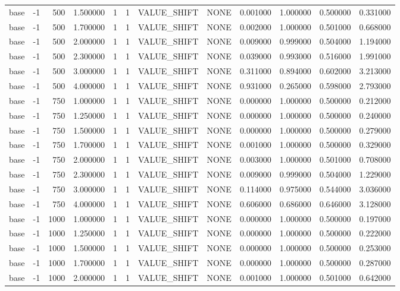 \begin{tabular}{lrrrllllrrrr}
base & -1 & 500 & 1.500000 & 1 & 1 & VALUE_SHIFT & NONE & 0.001000 & 1.000000 & 0.500000 & 0.331000 \\
base & -1 & 500 & 1.700000 & 1 & 1 & VALUE_SHIFT & NONE & 0.002000 & 1.000000 & 0.501000 & 0.668000 \\
base & -1 & 500 & 2.000000 & 1 & 1 & VALUE_SHIFT & NONE & 0.009000 & 0.999000 & 0.504000 & 1.194000 \\
base & -1 & 500 & 2.300000 & 1 & 1 & VALUE_SHIFT & NONE & 0.039000 & 0.993000 & 0.516000 & 1.991000 \\
base & -1 & 500 & 3.000000 & 1 & 1 & VALUE_SHIFT & NONE & 0.311000 & 0.894000 & 0.602000 & 3.213000 \\
base & -1 & 500 & 4.000000 & 1 & 1 & VALUE_SHIFT & NONE & 0.931000 & 0.265000 & 0.598000 & 2.793000 \\
base & -1 & 750 & 1.000000 & 1 & 1 & VALUE_SHIFT & NONE & 0.000000 & 1.000000 & 0.500000 & 0.212000 \\
base & -1 & 750 & 1.250000 & 1 & 1 & VALUE_SHIFT & NONE & 0.000000 & 1.000000 & 0.500000 & 0.240000 \\
base & -1 & 750 & 1.500000 & 1 & 1 & VALUE_SHIFT & NONE & 0.000000 & 1.000000 & 0.500000 & 0.279000 \\
base & -1 & 750 & 1.700000 & 1 & 1 & VALUE_SHIFT & NONE & 0.001000 & 1.000000 & 0.500000 & 0.329000 \\
base & -1 & 750 & 2.000000 & 1 & 1 & VALUE_SHIFT & NONE & 0.003000 & 1.000000 & 0.501000 & 0.708000 \\
base & -1 & 750 & 2.300000 & 1 & 1 & VALUE_SHIFT & NONE & 0.009000 & 0.999000 & 0.504000 & 1.229000 \\
base & -1 & 750 & 3.000000 & 1 & 1 & VALUE_SHIFT & NONE & 0.114000 & 0.975000 & 0.544000 & 3.036000 \\
base & -1 & 750 & 4.000000 & 1 & 1 & VALUE_SHIFT & NONE & 0.606000 & 0.686000 & 0.646000 & 3.128000 \\
base & -1 & 1000 & 1.000000 & 1 & 1 & VALUE_SHIFT & NONE & 0.000000 & 1.000000 & 0.500000 & 0.197000 \\
base & -1 & 1000 & 1.250000 & 1 & 1 & VALUE_SHIFT & NONE & 0.000000 & 1.000000 & 0.500000 & 0.222000 \\
base & -1 & 1000 & 1.500000 & 1 & 1 & VALUE_SHIFT & NONE & 0.000000 & 1.000000 & 0.500000 & 0.253000 \\
base & -1 & 1000 & 1.700000 & 1 & 1 & VALUE_SHIFT & NONE & 0.000000 & 1.000000 & 0.500000 & 0.287000 \\
base & -1 & 1000 & 2.000000 & 1 & 1 & VALUE_SHIFT & NONE & 0.001000 & 1.000000 & 0.501000 & 0.642000 \\

\end{tabular}
